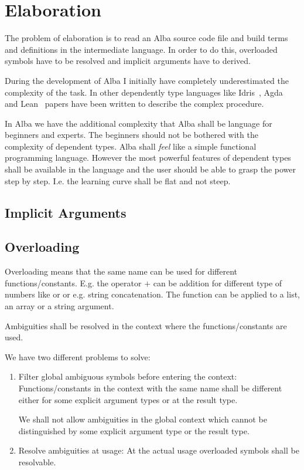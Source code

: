 \chapter{Elaboration}

The problem of elaboration is to read an Alba source code file and build terms
and definitions in the intermediate language. In order to do this, overloaded
symbols have to be resolved and implicit arguments have to derived.

During the development of Alba I initially have completely underestimated the
complexity of the task. In other dependently type languages like
Idris~\cite{brady2013}, Agda~\cite{norell2007} and Lean~\cite{demoura2015} papers
have been written to describe the complex procedure.

In Alba we have the additional complexity that Alba shall be language for
beginners and experts. The beginners should not be bothered with the complexity
of dependent types. Alba shall \emph{feel} like a simple functional programming
language. However the most powerful features of dependent types shall be
available in the language and the user should be able to grasp the power step by
step. I.e. the learning curve shall be flat and not steep.



\section{Implicit Arguments}





\section{Overloading}

Overloading means that the same name can be used for different
functions/constants. E.g. the operator $+$ can be addition for different type of
numbers like  or  or e.g. string concatenation. The
function  can be applied to a list, an array or a string argument.

Ambiguities shall be resolved in the context where the functions/constants are
used.

We have two different problems to solve:
\begin{enumerate}

\item Filter global ambiguous symbols before entering the context:
Functions/constants in the context with the same name shall be different either
for some explicit argument types or at the result type.

We shall not allow ambiguities in the global context which cannot be
distinguished by some explicit argument type or the result type.


\item Resolve ambiguities at usage: At the actual usage overloaded symbols shall
be resolvable.

\end{enumerate}

